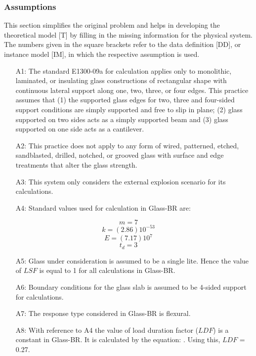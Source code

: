 \documentclass[12pt]{article}
\begin{document}
\subsubsection{Assumptions}
\label{Sec:As}
This section simplifies the original problem and helps in developing the theoretical model [T] by filling in the missing information for the physical system. The numbers given in the square brackets refer to the data definition [DD], or instance model [IM], in which the respective assumption is used.
\begin{itemize}
\item[A1:]The standard E1300-09a for calculation applies only to monolithic, laminated, or insulating glass constructions of rectangular shape with continuous lateral support along one, two, three, or four edges. This practice assumes that (1) the supported glass edges for two, three and four-sided support conditions are simply supported and free to slip in plane; (2) glass supported on two sides acts as a simply supported beam and (3) glass supported on one side acts as a cantilever.
\item[A2:]This practice does not apply to any form of wired, patterned, etched, sandblasted, drilled, notched, or grooved glass with surface and edge treatments that alter the glass strength.
\item[A3:]This system only considers the external explosion scenario for its calculations.
\item[A4:]Standard values used for calculation in Glass-BR are: 
\end{itemize}
\begin{equation}
m=7
\end{equation}
\begin{equation}
k=(2.86)10^{-53}
\end{equation}
\begin{equation}
E=(7.17)10^{7}
\end{equation}
\begin{equation}
t_{d}=3
\end{equation}
\begin{itemize}
\item[A5:]Glass under consideration is assumed to be a single lite. Hence the value of $LSF$ is equal to 1 for all calculations in Glass-BR.
\item[A6:]Boundary conditions for the glass slab is assumed to be 4-sided support for calculations.
\item[A7:]The response type considered in Glass-BR is flexural.
\item[A8:]With reference to A4 the value of load duration factor ($LDF$) is a constant in Glass-BR. It is calculated by the equation: . Using this, $LDF$ = 0.27.
\end{itemize}
\end{document}
